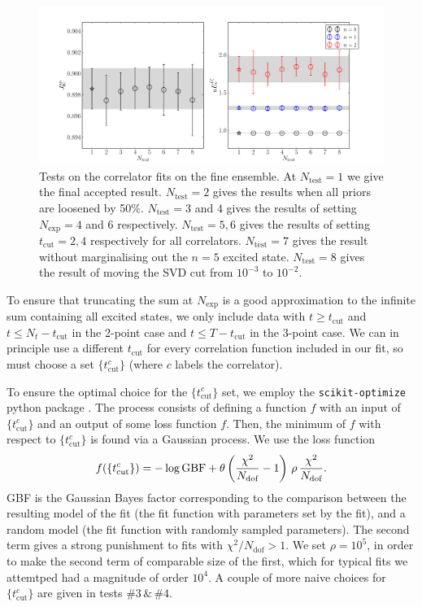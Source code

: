 \begin{figure}[htb!]
  \begin{center}
  \includegraphics[width=1.1\textwidth]{images/BsDsstar/fittests_fine.pdf}
  \caption{Tests on the correlator fits on the fine ensemble. At $N_{\text{test}}=1$ we give the final accepted result. $N_{\text{test}}=2$ gives the results when all priors are loosened by 50\%. $N_{\text{test}}=3$ and $4$ gives the results of setting $N_{\text{exp}}=4$ and $6$ respectively. $N_{\text{test}}=5,6$ gives the results of setting $t_{\text{cut}}=2,4$ respectively for all correlators. $N_{\text{test}}=7$ gives the result without marginalising out the $n=5$ excited state. $N_{\text{test}}=8$ gives the result of moving the SVD cut from $10^{-3}$ to $10^{-2}$. \label{fig:corr_fit_tests}}
  \end{center}
  \vspace{-10pt}
\end{figure}

To ensure that truncating the sum at $N_{\text{exp}}$ is a good approximation to the infinite sum containing all excited states, we only include data with  $t \geq t_{\text{cut}}$ and $t \leq N_t-t_{\text{cut}}$ in the 2-point case and $t \leq T-t_{\text{cut}}$ in the 3-point case. We can in principle use a different $t_{\text{cut}}$ for every correlation function included in our fit, so must choose a set $\{ t_{\text{cut}}^{c}\}$ (where $c$ labels the correlator).

To ensure the optimal choice for the $\{ t_{\text{cut}}^{c}\}$ set, we employ the \texttt{scikit-optimize} python package \cite{skopt}. The process consists of defining a function $f$ with an input of $\{ t_{\text{cut}}^{c}\}$ and an output of some loss function $f$. Then, the minimum of $f$ with respect to $\{ t_{\text{cut}}^{c}\}$ is found via a Gaussian process. We use the loss function
\begin{align}
  f(\{ t_{\text{cut}}^{c}\}) = - \log \text{GBF} + \theta\left({\chi^2\over N_{\text{dof}}}-1\right) \,\rho\, {\chi^2\over N_{\text{dof}}}.
\end{align}
GBF is the Gaussian Bayes factor corresponding to the comparison between the resulting model of the fit (the fit function with parameters set by the fit), and a random model (the fit function with randomly sampled parameters). The second term gives a strong punishment to fits with $\chi^2/N_{\text{dof}} > 1$. We set $\rho=10^5$, in order to make the second term of comparable size of the first, which for typical fits we attemtped had a magnitude of order $10^4$. A couple of more naive choices for $\{ t_{\text{cut}}^{c}\}$ are given in tests $\#3 \,\&\, \#4$.

